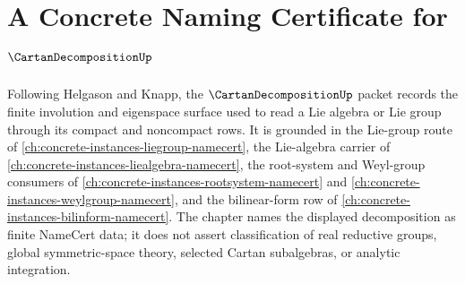 \chapter{A Concrete Naming Certificate for $\CartanDecompositionUp$}
\label{ch:concrete-instances-cartan-decomposition-namecert}

Following Helgason and Knapp, the $\CartanDecompositionUp$ packet records the finite involution and eigenspace surface used to read a Lie algebra or Lie group through its compact and noncompact rows. It is grounded in the Lie-group route of \autoref{ch:concrete-instances-liegroup-namecert}, the Lie-algebra carrier of \autoref{ch:concrete-instances-liealgebra-namecert}, the root-system and Weyl-group consumers of \autoref{ch:concrete-instances-rootsystem-namecert} and \autoref{ch:concrete-instances-weylgroup-namecert}, and the bilinear-form row of \autoref{ch:concrete-instances-bilinform-namecert}. The chapter names the displayed decomposition as finite NameCert data; it does not assert classification of real reductive groups, global symmetric-space theory, selected Cartan subalgebras, or analytic integration.

